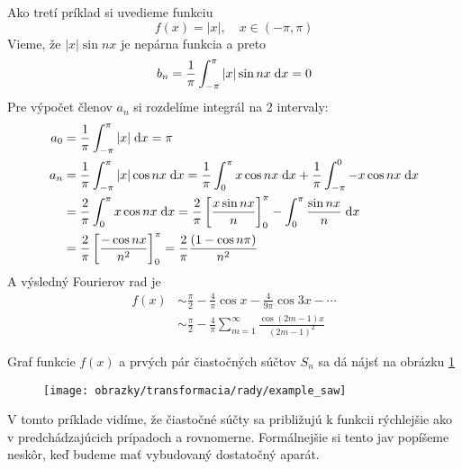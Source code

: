 \begin{priklad}
    Ako tretí príklad si uvedieme funkciu
    \begin{equation}
        f(x) = |x|, \quad x\in(-\pi,\pi)
    \end{equation}
    Vieme, že $|x| \sin nx$ je nepárna funkcia a preto
    \begin{equation}
        b_n = \frac{1}{\pi} \int_{-\pi}^{\pi} |x| \sin nx \; \mathrm{d} x = 0
    \end{equation}
    Pre výpočet členov $a_n$ si rozdelíme integrál na 2 intervaly:
    \begin{equation}
    \begin{split}
        a_0 &= \frac{1}{\pi} \int_{-\pi}^{\pi} |x| \; \mathrm{d} x = \pi \\
        a_n &= \frac{1}{\pi} \int_{-\pi}^{\pi} |x| \cos nx \; \mathrm{d} x 
            = \frac{1}{\pi} \int_0^{\pi} x \cos nx \; \mathrm{d} x +
                \frac{1}{\pi} \int_{-\pi}^0 -x \cos nx \; \mathrm{d} x \\
            &= \frac{2}{\pi} \int_0^{\pi} x \cos nx \; \mathrm{d} x 
             = \frac{2}{\pi} \left[
                \frac{x \sin nx}{n}
                \right]_0^{\pi} -
                \int_0^{\pi} \frac{\sin nx}{n} \; \mathrm{d} x \\
            &= \frac{2}{\pi} \left[
                    \frac{-\cos nx}{n^2} \right]_0^\pi 
            = \frac{2}{\pi} \frac{(1-\cos n\pi)}{n^2}
    \end{split}
    \end{equation}
    A výsledný Fourierov rad je
    \begin{equation}
    \begin{split}
        f(x) &\sim \frac{\pi}{2} - \frac{4}{\pi} \cos x -
            \frac{4}{9\pi} \cos 3x - \cdots \\
            &\sim \frac{\pi}{2} - \frac{4}{\pi}
                \sum_{m=1}^{\infty} \frac{\cos(2m-1) x}{(2m-1)^2}            
    \end{split}
    \end{equation}
    
    Graf funkcie $f(x)$ a prvých pár čiastočných súčtov $S_n$ sa dá
    nájsť na obrázku \ref{fig:example_saw}

    \begin{figure}[htp]
        \centering
        \texttt{[image: obrazky/transformacia/rady/example\_saw]}
        \caption{}
        \label{fig:example_saw}
    \end{figure}    
 V tomto príklade vidíme, že čiastočné súčty sa približujú k funkcii
 rýchlejšie ako v predchádzajúcich prípadoch a rovnomerne.
 Formálnejšie si tento jav popíšeme neskôr, keď budeme mať vybudovaný
 dostatočný aparát.
\end{priklad}

